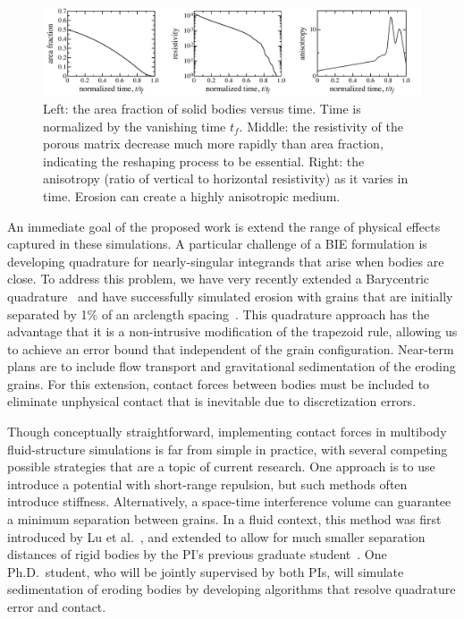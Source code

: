 \documentclass[11pt]{article}
\begin{document}
\begin{figure}%
\begin{center}
\includegraphics[width = 0.99 \textwidth]{./figs/fig3.pdf}
\caption{\label{fig3} Left: the area fraction of solid bodies versus time. Time is normalized by the vanishing time $t_f$. Middle: the resistivity of the porous matrix decrease much more rapidly than area fraction, indicating the reshaping process to be essential. Right: the anisotropy (ratio of vertical to horizontal resistivity) as it varies in time. Erosion can create a highly anisotropic medium.
}
\end{center}
\end{figure}


An immediate goal of the proposed work is extend the range of physical effects captured in these simulations. A particular challenge of a BIE formulation is developing quadrature for nearly-singular integrands that arise when bodies are close. To address this problem, we have very recently extended a Barycentric quadrature~\cite{bar2014, bar-wu-vee2015} and have successfully simulated erosion with grains that are initially separated by 1\% of an arclength spacing~\cite{chi-moo-qua2019}. This quadrature approach has the advantage that it is a non-intrusive modification of the trapezoid rule, allowing us to achieve an error bound that independent of the grain configuration. Near-term plans are to include flow transport and gravitational sedimentation of the eroding grains. For this extension, contact forces between bodies must be included to eliminate unphysical contact that is inevitable due to discretization errors. 

Though conceptually straightforward, implementing contact forces in multibody fluid-structure simulations is far from simple in practice, with several competing possible strategies that are a topic of current research.  One approach is to use introduce a potential with short-range repulsion, but such methods often introduce stiffness. Alternatively, a space-time interference volume can guarantee a minimum separation between grains.  In a fluid context, this method was first introduced by Lu et al.~\cite{lu-rah-zor2017}, and extended to allow for much smaller separation distances of rigid bodies by the PI's previous graduate student~\cite{bys-sha-qua2019}. One Ph.D.~student, who will be jointly supervised by both PIs, will simulate sedimentation of eroding bodies by developing algorithms that resolve quadrature error and contact.
\end{document}
